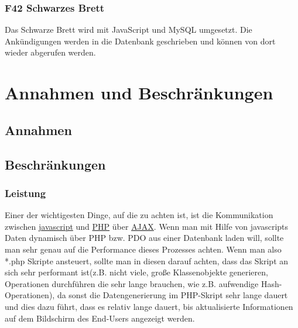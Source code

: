 \documentclass[10pt,a4paper]{scrartcl}
\begin{document}
% 
% 
% 
% 

\subsubsection*{F42 Schwarzes Brett}

Das Schwarze Brett wird mit JavaScript und MySQL umgesetzt. Die Ank\"undigungen werden in die Datenbank geschrieben und k\"onnen von dort wieder abgerufen werden. 


\section{Annahmen und Beschränkungen}
\subsection{Annahmen}

\subsection{Beschränkungen}

\subsubsection*{Leistung}

Einer der wichtigesten Dinge, auf die zu achten ist, ist die Kommunikation zwischen \underline{javascript} und \underline{PHP} 
über \underline{AJAX}. Wenn man mit Hilfe von javascripts Daten dynamisch über PHP bzw. PDO aus einer Datenbank laden will, sollte man
sehr genau auf die Performance dieses Prozesses achten. Wenn man also *.php Skripte ansteuert, sollte man in diesen darauf achten, dass
das Skript an sich sehr performant ist(z.B. nicht viele, große Klassenobjekte generieren, Operationen durchführen die sehr lange brauchen,
wie z.B. aufwendige Hash-Operationen), da sonst die Datengenerierung im PHP-Skript sehr lange dauert und dies dazu führt, dass 
es relativ lange dauert, bis aktualisierte Informationen auf dem Bildschirm des End-Users angezeigt werden.
\end{document}
